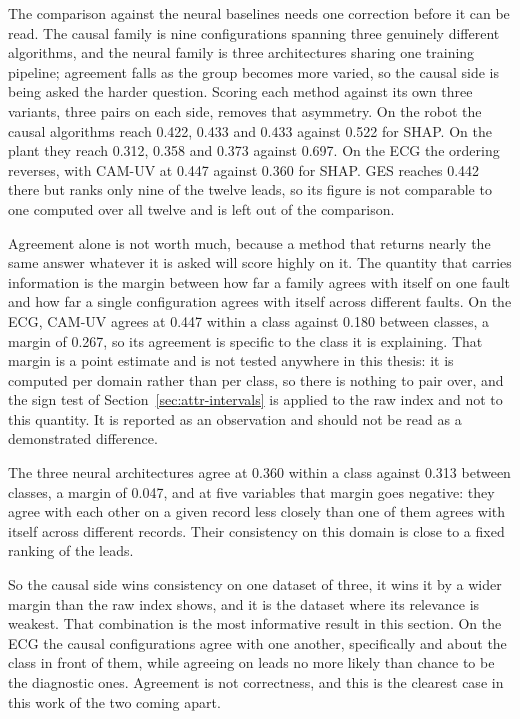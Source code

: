 The comparison against the neural baselines needs one correction before it can
be read. The causal family is nine configurations spanning three genuinely
different algorithms, and the neural family is three architectures sharing one
training pipeline; agreement falls as the group becomes more varied, so the
causal side is being asked the harder question. Scoring each method against its
own three variants, three pairs on each side, removes that asymmetry. On the
robot the causal algorithms reach 0.422, 0.433 and 0.433 against 0.522 for SHAP.
On the plant they reach 0.312, 0.358 and 0.373 against 0.697. On the ECG the
ordering reverses, with CAM-UV at 0.447 against 0.360 for SHAP. GES reaches
0.442 there but ranks only nine of the twelve leads, so its figure is not
comparable to one computed over all twelve and is left out of the comparison.

Agreement alone is not worth much, because a method that returns nearly the same
answer whatever it is asked will score highly on it. The quantity that carries
information is the margin between how far a family agrees with itself on one
fault and how far a single configuration agrees with itself across different
faults. On the ECG, CAM-UV agrees at 0.447 within a class against 0.180 between
classes, a margin of 0.267, so its agreement is specific to the class it is
explaining. That margin is a point estimate and is not tested anywhere in this thesis: it is computed per domain rather than per class, so there is nothing to pair over, and the sign test of Section~\ref{sec:attr-intervals} is applied to the raw index and not to this quantity. It is reported as an observation and should not be read as a demonstrated difference.

The three neural architectures agree at 0.360 within a class against
0.313 between classes, a margin of 0.047, and at five variables that margin goes
negative: they agree with each other on a given record less closely than one of
them agrees with itself across different records. Their consistency on this
domain is close to a fixed ranking of the leads.

So the causal side wins consistency on one dataset of three, it wins it by a
wider margin than the raw index shows, and it is the dataset where its
relevance is weakest. That combination is the most informative result in this
section. On the ECG the causal configurations agree with one another, specifically
and about the class in front of them, while agreeing on leads no more likely than
chance to be the diagnostic ones. Agreement is not correctness, and this is the
clearest case in this work of the two coming apart.

